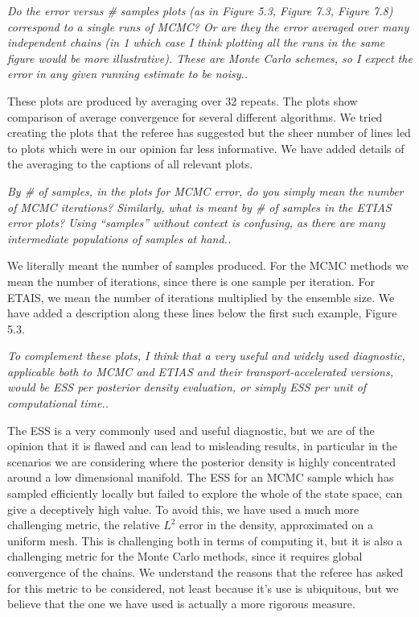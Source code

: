 \documentclass{article}
\newcommand{\comment}[2]{\vspace{0.6cm}{\bf Comment:} {\it #1.}

\vspace{0.3cm}{\bf Answer:} #2}
\begin{document}

\comment{Do the error versus \# samples plots (as in Figure 5.3, Figure 7.3, Figure 7.8) correspond to a single runs of MCMC? Or are they the error averaged over many independent chains (in
1
which case I think plotting all the runs in the same figure would be more illustrative). These are Monte Carlo schemes, so I expect the error in any given running estimate to be noisy.}{These plots are produced by averaging over 32 repeats. The plots show comparison of average convergence for several different algorithms. We tried creating the plots that the referee has suggested but the sheer number of lines led to plots which were in our opinion far less informative. We have added details of the averaging to the captions of all relevant plots.}


\comment{By \# of samples, in the plots for MCMC error, do you simply mean the number of MCMC iterations? Similarly, what is meant by \# of samples in the ETIAS error plots? Using “samples” without context is confusing, as there are many intermediate populations of samples at hand.}{We literally meant the number of samples produced. For the MCMC methods we mean the number of iterations, since there is one sample per iteration. For ETAIS, we mean the number of iterations multiplied by the ensemble size. We have added a description along these lines below the first such example, Figure 5.3.}


\comment{To complement these plots, I think that a very useful and widely used diagnostic, applicable both to MCMC and ETIAS and their transport-accelerated versions, would be ESS per posterior density evaluation, or simply ESS per unit of computational time.}{The ESS is a very commonly used and useful diagnostic, but we are of the opinion that it is flawed and can lead to misleading results, in particular in the scenarios we are considering where the posterior density is highly concentrated around a low dimensional manifold. The ESS for an MCMC sample which has sampled efficiently locally but failed to explore the whole of the state space, can give a deceptively high value. To avoid this, we have used a much more challenging metric, the relative $L^2$ error in the density, approximated on a uniform mesh. This is challenging both in terms of computing it, but it is also a challenging metric for the Monte Carlo methods, since it requires global convergence of the chains. We understand the reasons that the referee has asked for this metric to be considered, not least because it's use is ubiquitous, but we believe that the one we have used is actually a more rigorous measure.}
\end{document}
